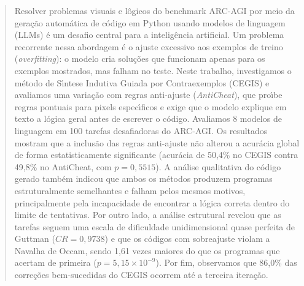 \begin{abstract}
Resolver problemas visuais e l\^{o}gicos do benchmark ARC-AGI por meio da gera\c{c}\~{a}o autom\'{a}tica de c\'{o}digo em Python usando modelos de linguagem (LLMs) \'{e} um desafio central para a intelig\^{e}ncia artificial. Um problema recorrente nessa abordagem \'{e} o ajuste excessivo aos exemplos de treino (\textit{overfitting}): o modelo cria solu\c{c}\~{o}es que funcionam apenas para os exemplos mostrados, mas falham no teste. Neste trabalho, investigamos o m\'{e}todo de S\'{\i}ntese Indutiva Guiada por Contraexemplos (CEGIS) e avaliamos uma varia\c{c}\~{a}o com regras anti-ajuste (\textit{AntiCheat}), que pro\'{\i}be regras pontuais para pixels espec\'{\i}ficos e exige que o modelo explique em texto a l\'{o}gica geral antes de escrever o c\'{o}digo. Avaliamos 8 modelos de linguagem em 100 tarefas desafiadoras do ARC-AGI. Os resultados mostram que a inclus\~{a}o das regras anti-ajuste n\~{a}o alterou a acur\'{a}cia global de forma estatisticamente significante (acur\'{a}cia de 50,4\% no CEGIS contra 49,8\% no AntiCheat, com $p = 0,5515$). A an\'{a}lise qualitativa do c\'{o}digo gerado tamb\'{e}m indicou que ambos os m\'{e}todos produzem programas estruturalmente semelhantes e falham pelos mesmos motivos, principalmente pela incapacidade de encontrar a l\'{o}gica correta dentro do limite de tentativas. Por outro lado, a an\'{a}lise estrutural revelou que as tarefas seguem uma escala de dificuldade unidimensional quase perfeita de Guttman ($CR = 0,9738$) e que os c\'{o}digos com sobreajuste violam a Navalha de Occam, sendo 1,61 vezes maiores do que os programas que acertam de primeira ($p = 5,15 \times 10^{-9}$). Por fim, observamos que 86,0\% das corre\c{c}\~{o}es bem-sucedidas do CEGIS ocorrem at\'{e} a terceira itera\c{c}\~{a}o.
\end{abstract}


